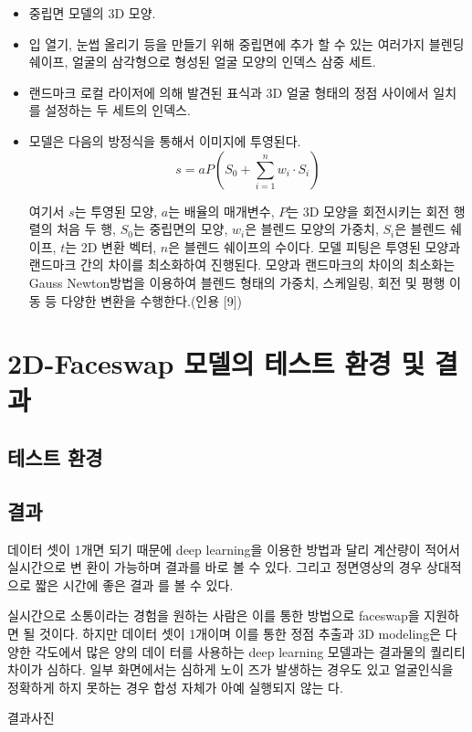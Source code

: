 \begin{itemize}
    \item 중립면 모델의 3D 모양.
    \item 입 열기, 눈썹 올리기 등을 만들기 위해 중립면에 추가 할 수 있는 여러가지 블렌딩 쉐이프, 얼굴의 삼각형으로 형성된 얼굴 모양의 인덱스 삼중 세트.
    \item 랜드마크 로컬 라이저에 의해 발견된 표식과 3D 얼굴 형태의 정점 사이에서 일치를 설정하는 두 세트의 인덱스.
    \item 모델은 다음의 방정식을 통해서 이미지에 투영된다.
    \[ s = aP \left( S_{0} + \sum_{i=1}^{n} w_{i}\cdot S_{i}  \right)   \]

    여기서 $s$는 투영된 모양, $a$는 배율의 매개변수, $P$는 3D 모양을 회전시키는 회전 행렬의 처음 두 행, $S_0$는 중립면의 모양, $w_i$은 블렌드 모양의 가중치, $S_i$은 블렌드 쉐이프, $t$는 2D 변환 벡터, $n$은 블렌드 쉐이프의 수이다.
    모델 피팅은 투영된 모양과 랜드마크 간의 차이를 최소화하여 진행된다. 모양과 랜드마크의 차이의 최소화는 Gauss Newton방법을 이용하여 블렌드 형태의 가중치, 스케일링, 회전 및 평행 이동 등 다양한 변환을 수행한다.(인용 [9])
\end{itemize}

\section{2D-Faceswap 모델의 테스트 환경 및 결과}

\subsection{테스트 환경}
\spec
\subsection{결과}

데이터 셋이 1개면 되기 때문에 deep learning을 이용한 방법과 달리 계산량이 적어서 실시간으로 변 환이 가능하며 결과를 바로 볼 수 있다. 그리고 정면영상의 경우 상대적으로 짧은 시간에 좋은 결과 를 볼 수 있다.

실시간으로 소통이라는 경험을 원하는 사람은 이를 통한 방법으로 faceswap을 지원하면 될 것이다.  하지만 데이터 셋이 1개이며 이를 통한 정점 추출과 3D modeling은 다양한 각도에서 많은 양의 데이 터를 사용하는 deep learning 모델과는 결과물의 퀄리티 차이가 심하다. 일부 화면에서는 심하게 노이 즈가 발생하는 경우도 있고 얼굴인식을 정확하게 하지 못하는 경우 합성 자체가 아예 실행되지 않는 다.

결과사진 

